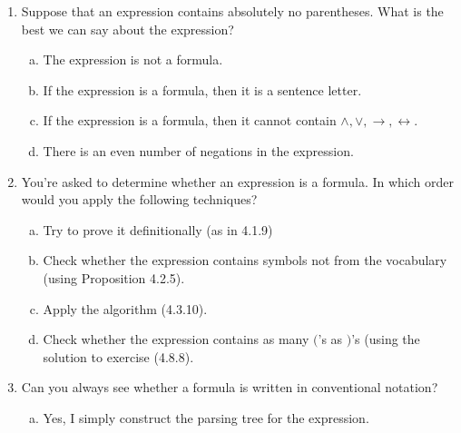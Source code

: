 	\begin{enumerate}[\thesection.1]

		\item Suppose that an expression contains absolutely no parentheses. What is the best we can say about the expression?
		
			\begin{enumerate}[(a)]

				\item The expression is not a formula.
				
				\item If the expression is a formula, then it is a sentence letter.
				
				\item If the expression is a formula, then it cannot contain $\land,\lor,\to,\leftrightarrow$.
				
				\item There is an even number of negations in the expression.
	
			\end{enumerate}
			
		\item You're asked to determine whether an expression is a formula. In which order would you apply the following techniques?
		
		\begin{enumerate}[(a)]
		
			\item Try to prove it definitionally (as in 4.1.9)
		
			\item Check whether the expression contains symbols not from the vocabulary (using Proposition 4.2.5).
			
			\item Apply the algorithm (4.3.10).
			
			\item Check whether the expression contains as many $($'s as $)$'s (using the solution to exercise (4.8.8).
		
		\end{enumerate}
		
	\item Can you always see whether a formula is written in conventional notation?
	
	\begin{enumerate}[(a)]
	
		\item Yes, I simply construct the parsing tree for the expression.
		

\end{enumerate}
\end{enumerate}
